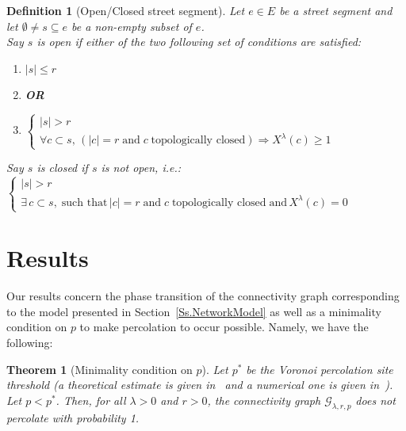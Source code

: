 \documentclass[10pt,a4paper]{amsart}
\theoremstyle{exampstyle}
\newtheorem{Theorem}{Theorem}
\newtheorem{Definition}{Definition}
\theoremstyle{exampnotations}
\begin{document}
\begin{Definition}[Open/Closed street segment]
\label{Def.open/closed/subcritical}
Let $e \in E$ be a street segment and let $\emptyset \neq s \subseteq e$ be a non-empty subset of $e$.\\ Say $s$ is \emph{open} if either of the two following set of conditions are satisfied:
\begin{enumerate}
\item $\vert s \vert \leq r$
\vspace{.2 cm}
\item[]\textbf{OR}
\vspace{.2 cm}
\item $\left\{
\begin{array}{l}
\vert s \vert > r \\
\forall c \subset s, \, (\vert c \vert = r \; \text{and} \; c  \; \text{topologically closed} )\Rightarrow X^{\lambda}(c) \geq 1
\end{array}
\right.$
\end{enumerate}
Say $s$ is \emph{closed} if $s$ is not open, i.e.: \\
 $\left\{
\begin{array}{l}
\vert s \vert > r \\
\exists \, c \subset s, \; \text{such that} \, \vert c \vert = r \; \text{and} \; c  \; \text{topologically closed} \; \text{and} \,  X^{\lambda}(c) = 0
\end{array}
\right.$
\end{Definition}

\section{Results}
Our results concern the phase transition of the connectivity graph corresponding to the model presented in Section~\ref{Ss.NetworkModel} as well as a minimality condition on $p$ to make percolation to occur possible. Namely, we have the following:

\begin{Theorem}[Minimality condition on $p$]
\label{Thm.minimality}
Let $p^{*}$ be the Voronoi percolation site threshold (a theoretical estimate is given in~\cite{neher2008topological} and a numerical one is given in~\cite{becker_percolation_2009}). Let $p < p^*$. Then, for all $\lambda > 0$ and $r >0$, the connectivity graph $\mathcal{G}_{\lambda,r,p}$ does not percolate with probability 1.
\end{Theorem}
\end{document}
